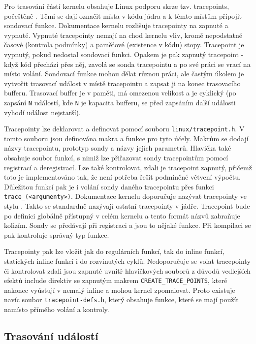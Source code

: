 Pro trasování částí kernelu obsahuje Linux podporu skrze tzv. tracepoints, počeštěně . Těmi se dají označit místa v kódu jádra a k těmto místům připojit sondovací funkce. Dokumentace kernelu rozlišuje tracepointy na zapnuté a vypnuté. Vypnuté tracepointy nemají na chod kernelu vliv, kromě nepodstatné časové (kontrola podmínky) a paměťové (existence v kódu) stopy. Tracepoint je vypnutý, pokud nedostal sondovací funkci. Opakem je pak zapnutý tracepoint - když kód přechází přes něj, zavolá se sonda tracepointu a po své práci se vrací na místo volání. Sondovací funkce mohou dělat různou práci, ale častým úkolem je vytvořit trasovací událost v místě tracepointu a zapsat ji na konec trasovacího bufferu. Trasovací buffer je v paměti, má omezenou velikost a je cyklický (po zapsání \texttt{N} událostí, kde \texttt{N} je kapacita bufferu, se před zapsáním další události vyhodí událost nejstarší).

Tracepointy lze deklarovat a definovat pomocí souboru \texttt{linux/tracepoint.h}. V tomto souboru jsou definována makra a funkce pro tyto účely. Makrům se dodají názvy tracepointu, prototyp sondy a názvy jejích parametrů. Hlavička také obsahuje soubor funkcí, s nimiž lze přiřazovat sondy tracepointům pomocí registrací a deregistrací. Lze také kontrolovat, zdali je tracepoint zapnutý, přičemž toto je implementováno tak, že není potřeba řešit podmíněné větvení výpočtu. Důležitou funkcí pak je i volání sondy daného tracepointu přes funkci \texttt{trace\_<název tracepointu>(<argumenty>)}. Dokumentace kernelu doporučuje nazývat tracepointy ve stylu . Takto se standardně nazývají ostatní tracepointy v jádře. Tracepoint bude po definici globálně přístupný v celém kernelu a tento formát názvů zabraňuje kolizím. Sondy se předávají při registraci a jsou to nějaké funkce. Při kompilaci se pak kontroluje správný typ funkce.

Tracepointy pak lze vložit jak do regulárních funkcí, tak do inline funkcí, statických inline funkcí i do rozvinutých cyklů. Nedoporučuje se volat tracepointy či kontrolovat zdali jsou zapnuté uvnitř hlavičkových souborů z důvodů vedlejších efektů include direktiv se zapnutým makrem \texttt{CREATE\_TRACE\_POINTS}, které nakonec vyúsťují v nemalý inline a mohou kernel zpomalovat. Proto existuje navíc soubor \texttt{tracepoint-defs.h}, který obsahuje funkce, které se mají použít namísto přímého volání a kontroly.

\subsection{Trasování událostí}

